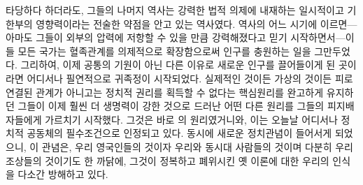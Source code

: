 타당하다 하더라도, 그들의 나머지 역사는
강력한 법적 의제에 내재하는 일시적이고 기한부의 영향력이라는
전술한 약점을 안고 있는 역사였다.
역사의 어느 시기에 이르면---아마도 그들이 외부의 압력에 저항할 수 있을 만큼
강력해졌다고 믿기 시작하면서---이들 모든 국가는
혈족관계를 의제적으로 확장함으로써 인구를 충원하는 일을 그만두었다.
그리하여,
이제 공통의 기원이 아닌 다른 이유로 새로운 인구를 끌어들이게 된 곳이라면
어디서나 필연적으로 귀족정이 시작되었다.
실제적인 것이든 가상의 것이든
피로 연결된 관계가 아니고는 정치적 권리를 획득할 수 없다는
핵심원리를 완고하게 유지하던 그들이 이제
훨씬 더 생명력이 강한 것으로 드러난
어떤 다른 원리를
그들의 피지배자들에게
가르치기 시작했다.
그것은 바로 의 원리였거니와,
이는 오늘날 어디서나 정치적 공동체의 필수조건으로 인정되고 있다.
동시에 새로운 정치관념이 들어서게 되었으니,
이 관념은,
우리 영국인들의 것이자 우리와 동시대 사람들의 것이며
다분히 우리 조상들의 것이기도 한 까닭에,
그것이 정복하고 폐위시킨 옛 이론에 대한 우리의 인식을 다소간
방해하고 있다.

